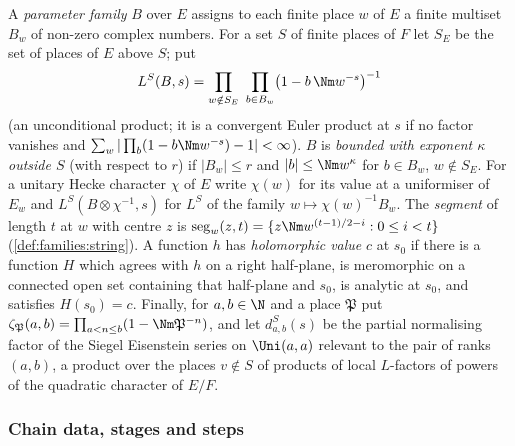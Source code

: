 A \emph{parameter family} $B$ over $E$ assigns to each finite place $w$ of $E$ a finite multiset $B_w$ of non-zero complex numbers. For a
set $S$ of finite places of $F$ let $S_E$ be the set of places of $E$ above $S$; put
\[
L^S(B,s)=\prod_{w\notin S_E}\ \prod_{b\in B_w}\bigl(1-b\,\Nm w^{-s}\bigr)^{-1}
\]
(an unconditional product; it is a convergent Euler product at $s$ if no factor vanishes and $\sum_w|\prod_b(1-b\Nm w^{-s})-1|<\infty$).
$B$ is \emph{bounded with exponent $\kappa$ outside $S$} (with respect to $r$) if $|B_w|\le r$ and $|b|\le\Nm w^{\kappa}$ for $b\in B_w$,
$w\notin S_E$. For a unitary Hecke character $\chi$ of $E$ write $\chi(w)$ for its value at a uniformiser of $E_w$ and
$L^S(B\otimes\chi^{-1},s)$ for $L^S$ of the family $w\mapsto\chi(w)^{-1}B_w$. The \emph{segment} of length $t$ at $w$ with centre $z$ is
$\mathrm{seg}_w(z,t)=\{z\Nm w^{(t-1)/2-i}:0\le i<t\}$ (\cref{def:families:string}). A function $h$ has \emph{holomorphic value} $c$ at
$s_0$ if there is a function $H$ which agrees with $h$ on a right half-plane, is meromorphic on a connected open set containing that
half-plane and $s_0$, is analytic at $s_0$, and satisfies $H(s_0)=c$. Finally, for $a,b\in\N$ and a place $\mathfrak P$ put
$\zeta_{\mathfrak P}(a,b)=\prod_{a<n\le b}(1-\Nm\mathfrak P^{-n})$, and let $d^S_{a,b}(s)$ be the partial normalising factor of the
Siegel Eisenstein series on $\Uni(a,a)$ relevant to the pair of ranks $(a,b)$, a product over the places $v\notin S$ of products of
local $L$-factors of powers of the quadratic character of $E/F$.

\subsubsection{Chain data, stages and steps}

